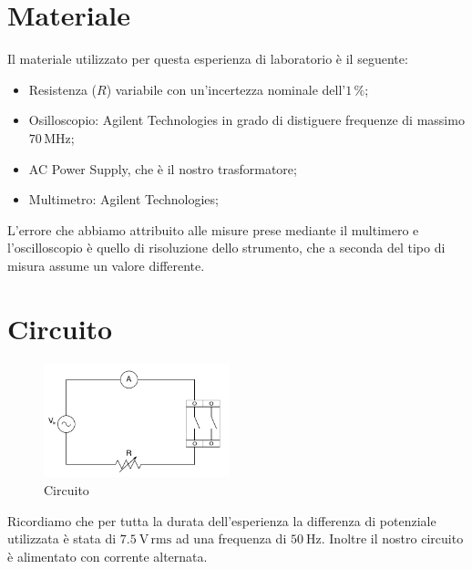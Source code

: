 \section*{Materiale}

Il materiale utilizzato per questa esperienza di laboratorio è il seguente:

\begin{itemize}
    \setlength{\itemsep}{1pt}
	\item{Resistenza ($R$) variabile con un'incertezza nominale dell'$1\,\%$;}
	\item{Osilloscopio: Agilent Technologies in grado di distiguere frequenze di massimo $70\,\si{\mega\hertz}$;}
	\item{AC Power Supply, che è il nostro trasformatore;}
	\item{Multimetro: Agilent Technologies;}
\end{itemize}

L'errore che abbiamo attribuito alle misure prese mediante il multimero e l'oscilloscopio è quello di risoluzione dello strumento, che a seconda del tipo di misura assume un valore differente.

\section*{Circuito}

\begin{figure}
    \vspace{-1cm}
    \includegraphics[width=0.48\textwidth]{sc.pdf}
    \caption{Circuito}
    \label{fig:circuito}
    \vspace{-1cm}
\end{figure}

Ricordiamo che per tutta la durata dell'esperienza la differenza di potenziale utilizzata è stata di $\SI{7.5}{\volt}\,\text{rms}$ ad una frequenza di $\SI{50}{\hertz}$. Inoltre il nostro circuito è alimentato con corrente alternata.
